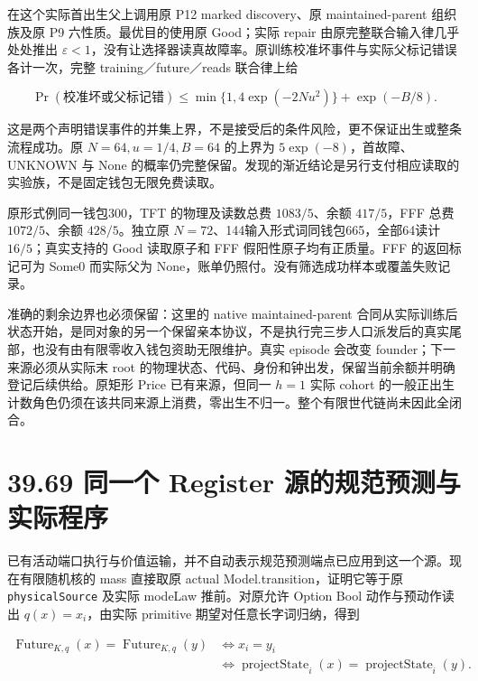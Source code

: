 \documentclass[
  11pt,
  oneside]{book}
\begin{document}
在这个实际首出生父上调用原 P12 marked discovery、原 maintained-parent 组织族及原 P9 六性质。最优目的使用原 Good；实际 repair 由原完整联合输入律几乎处处推出 \(\varepsilon<1\)，没有让选择器读真故障率。原训练校准坏事件与实际父标记错误各计一次，完整 training／future／reads 联合律上给

\[\Pr(\text{校准坏或父标记错})
\le \min\{1,4\exp(-2Nu^2)\}+\exp(-B/8).\]

这是两个声明错误事件的并集上界，不是接受后的条件风险，更不保证出生或整条流程成功。原 \(N=64,u=1/4,B=64\) 的上界为 \(5\exp(-8)\)，首故障、UNKNOWN 与 None 的概率仍完整保留。发现的渐近结论是另行支付相应读取的实验族，不是固定钱包无限免费读取。

原形式例同一钱包300，TFT 的物理及读数总费 \(1083/5\)、余额 \(417/5\)，FFF 总费 \(1072/5\)、余额 \(428/5\)。独立原 \(N=72\)、144输入形式词同钱包665，全部64读计 \(16/5\)；真实支持的 Good 读取原子和 FFF 假阳性原子均有正质量。FFF 的返回标记可为 Some0 而实际父为 None，账单仍照付。没有筛选成功样本或覆盖失败记录。

准确的剩余边界也必须保留：这里的 native maintained-parent 合同从实际训练后状态开始，是同对象的另一个保留亲本协议，不是执行完三步人口派发后的真实尾部，也没有由有限零收入钱包资助无限维护。真实 episode 会改变 founder；下一来源必须从实际末 root 的物理状态、代码、身份和钟出发，保留当前余额并明确登记后续供给。原矩形 Price 已有来源，但同一 \(h=1\) 实际 cohort 的一般正出生计数角色仍须在该共同来源上消费，零出生不归一。整个有限世代链尚未因此全闭合。

\section{39.69 同一个 Register 源的规范预测与实际程序}\label{ux540cux4e00ux4e2a-register-ux6e90ux7684ux89c4ux8303ux9884ux6d4bux4e0eux5b9eux9645ux7a0bux5e8f}

已有活动端口执行与价值运输，并不自动表示规范预测端点已应用到这一个源。现在有限随机核的 mass 直接取原 actual Model.transition，证明它等于原 \nolinkurl{physicalSource} 及实际 modeLaw 推前。对原允许 Option Bool 动作与预动作读出 \(q(x)=x_i\)，由实际 primitive 期望对任意长字词归纳，得到

\[\begin{aligned}
\operatorname{Future}_{K,q}(x)=\operatorname{Future}_{K,q}(y)
&\Longleftrightarrow x_i=y_i\\
&\Longleftrightarrow
\operatorname{projectState}_i(x)=\operatorname{projectState}_i(y).
\end{aligned}\]
\end{document}

